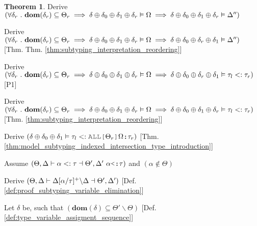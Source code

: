 \documentclass[acmsmall]{acmart}
\theoremstyle{definition}
\newtheorem{theorem}{Theorem}[section]
\begin{document}
\begin{theorem}
  \item \I\I \N Derive $(
    \forall \delta_r \ .\ 
    \textbf{dom}(\delta_r) \subseteq \Theta_r 
    \implies
    \delta \oplus \delta_0 \oplus \delta_1 \oplus \delta_r \vDash \Omega
    \implies
    \delta \oplus \delta_0 \oplus \delta_1 \oplus \delta_r \vDash \Delta''
  )$ 

  \item \I\I \N Derive $(
    \forall \delta_r \ .\ 
    \textbf{dom}(\delta_r) \subseteq \Theta_r
    \implies
    \delta \oplus \delta_0 \oplus \delta_1 \oplus \delta_r \vDash \Omega
    \implies
    \delta \oplus \delta_0 \oplus \delta_r \oplus \delta_1 \vDash \Delta''
  )$ [Thm. Thm. \ref{thm:subtyping_interpretation_reordering}]

  \item \I\I \N Derive $(
    \forall \delta_r \ .\ 
    \textbf{dom}(\delta_r) \subseteq \Theta_r
    \implies
    \delta \oplus \delta_0 \oplus \delta_1 \oplus \delta_r \vDash \Omega
    \implies
    \delta \oplus \delta_0 \oplus \delta_r \oplus \delta_1 \vDash \tau_l <: \tau_r
  )$ [P1] 

  \item \I\I \N Derive $(
    \forall \delta_r \ .\ 
    \textbf{dom}(\delta_r) \subseteq \Theta_r
    \implies
    \delta \oplus \delta_0 \oplus \delta_1 \oplus \delta_r \vDash \Omega
    \implies
    \delta \oplus \delta_0 \oplus \delta_1 \oplus \delta_r \vDash \tau_l <: \tau_r
  )$ [Thm. \ref{thm:subtyping_interpretation_reordering}]

  \item \I\I \N Derive $(
    \delta \oplus \delta_0 \oplus \delta_1 \satisfies \tau_l \subtypes \J{ALL[} \Theta_r \J{]} \Omega \J{:} \tau_r
  )$ [Thm. \ref{thm:model_subtyping_indexed_intersection_type_introduction}]


  \item \N Assume $(
    \Theta, \Delta \entails \alpha \subtypes \tau \given \Theta', \Delta'\ \alpha\J{<:}\tau
  )$ and $(
    \alpha \notin \Theta
  )$
  \item \I \N Derive $(
    \Theta, \Delta \vdash \Delta[\alpha\slash\tau]^{+} \backslash \Delta \dashv \Theta', \Delta'
  )$ [Def. \ref{def:proof_subtyping_variable_elimination}]

  \item \I \N Let $\delta$ be, such that $(
    \textbf{dom}(\delta) \subseteq \Theta' \backslash \Theta
  )$ [Def. \ref{def:type_variable_assigment_sequence}]


\end{theorem}
\end{document}
